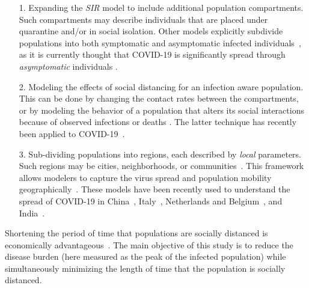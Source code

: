 \begin{itemize}
	\item[1.  ]Expanding the \textit{SIR} model to include additional population compartments.  Such compartments may describe individuals that are placed under quarantine and/or in social isolation.  Other models explicitly subdivide populations into both symptomatic and asymptomatic infected individuals~\cite{gevertz2020novel, pang2020public, etxeberria2019new, sun2020estimating, gaeta2020asymptomatic, rajabi2020investigating}, as it is currently thought  that COVID-19 is significantly spread through \emph{asymptomatic} individuals \cite{bai2020presumed, yu2020covid, hu2020clinical}.
	
	\item[2.  ]Modeling the effects of social distancing for an infection aware population.  This can be done by changing the contact rates between the compartments, or by modeling the behavior of a population that alters its social interactions because of observed infections or deaths \cite{kabir2019analysis, reluga2010game}.  The latter technique has recently been applied to COVID-19~\cite{franco2020feedback, ghaffarzadegan2020simulation}.
	
	\item[3.  ]Sub-dividing populations into regions, each described by \emph{local} parameters.  Such regions may be cities, neighborhoods, or communities~\cite{wang2020network}.  This framework allows modelers to capture the virus spread and population mobility geographically~\cite{chinazzi2020effect, flaxman2020estimating, san2020spreading, darabi2020centrality}. These models have been recently used to understand the spread of COVID-19 in China~\cite{kraemer2020effect}, Italy~\cite{gatto2020spread}, Netherlands and Belgium~\cite{van2020adherence}, and India~\cite{pujari2020multi, banerjee2020model}.
\end{itemize}

Shortening the period of time that populations are socially distanced is economically advantageous~\cite{NBERw27275, coibion2020cost, andersson2020optimal}. The main objective of this study is to reduce the disease burden (here measured as the peak of the infected population) while simultaneously minimizing the length of time that the population is socially distanced.  

